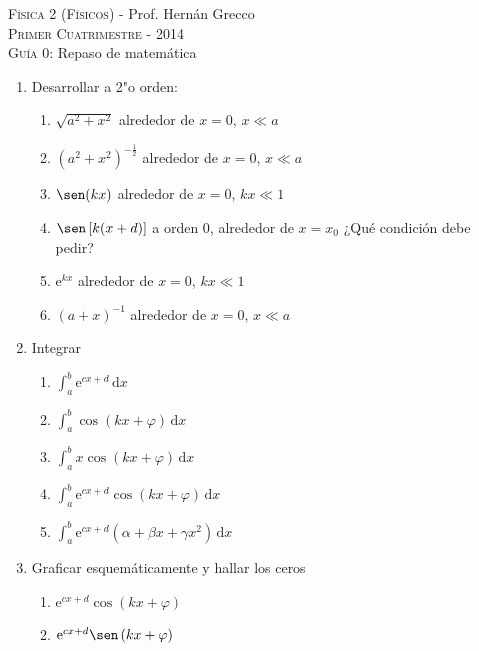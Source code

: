 \documentclass[11pt,spanish,a4paper]{article}
\begin{document}
\begin{center}
\textsc{\large Física 2 (Físicos)} - Prof. Hernán Grecco\\
\textsc{\large Primer Cuatrimestre - 2014}\\
\textsc{\large Guía 0:} Repaso de matemática
\end{center}

\begin{enumerate}

\item Desarrollar a 2"o orden:
\begin{enumerate}
	\item \( \sqrt{a^{2}+x^{2}} \) alrededor de \( x=0 \),  \( x\ll a \)
	\item \( \left(a^{2}+x^{2}\right)^{-\frac{1}{2}} \) alrededor de \(x=0 \), \(x \ll a \)
	\item \( \sen(kx) \) alrededor de \(x=0 \), \(kx \ll 1 \)
	\item \( \sen\left[k(x+d)\right] \) a orden 0, alrededor de \(x= x_{0} \) ¿Qué condición debe pedir?
	\item \( \mathrm{e}^{kx} \) alrededor de \(x=0 \), \(kx \ll 1 \)
	\item \( \left(a+x\right)^{-1} \) alrededor de \(x=0 \), \(x\ll a \)
\end{enumerate}

\item Integrar
\begin{enumerate}
	\item \(\int_{a}^{b} \mathrm{e}^{cx+d}\, \mathrm{d}x \)
	\item \(\int_{a}^{b} \cos\left(kx+\varphi\right)\, \mathrm{d}x\)
	\item \(\int_{a}^{b} x \cos\left(kx+\varphi\right)\, \mathrm{d}x \)
	\item \(\int_{a}^{b} \mathrm{e}^{cx+d} \cos\left(kx+\varphi\right)\, \mathrm{d}x\)
	\item \(\int_{a}^{b} \mathrm{e}^{cx+d} \left(\alpha+\beta x+\gamma x^{2}\right)\, \mathrm{d}x\)
\end{enumerate}

\item Graficar esquemáticamente y hallar los ceros
\begin{enumerate}
	\item \(\mathrm{e}^{cx+d} \cos\left(kx+ \varphi\right) \)
	\item \(\mathrm{e}^{cx+d} \sen\left(kx+ \varphi\right) \)
\end{enumerate}


\end{enumerate}
\end{document}
